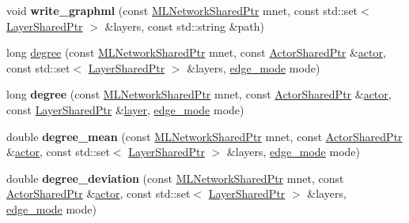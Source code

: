 \begin{DoxyCompactItemize}
\item 
\hypertarget{namespacemlnet_ad9d70122d3cdde2bbd59caa41d5c9e9d}{void {\bfseries write\+\_\+graphml} (const \hyperlink{namespacemlnet_aa6d3fa87865bcde4d1283abb1942cbbb}{M\+L\+Network\+Shared\+Ptr} mnet, const std\+::set$<$ \hyperlink{namespacemlnet_a10c007fb811c55339dd5b9d32bb0505d}{Layer\+Shared\+Ptr} $>$ \&layers, const std\+::string \&path)}\label{namespacemlnet_ad9d70122d3cdde2bbd59caa41d5c9e9d}

\item 
long \hyperlink{namespacemlnet_a50cfb15dd81a37b140f555047059915d}{degree} (const \hyperlink{namespacemlnet_aa6d3fa87865bcde4d1283abb1942cbbb}{M\+L\+Network\+Shared\+Ptr} mnet, const \hyperlink{namespacemlnet_a714fd98ffaeaadd5c38d61fa53dc4d24}{Actor\+Shared\+Ptr} \&\hyperlink{classmlnet_1_1actor}{actor}, const std\+::set$<$ \hyperlink{namespacemlnet_a10c007fb811c55339dd5b9d32bb0505d}{Layer\+Shared\+Ptr} $>$ \&layers, \hyperlink{namespacemlnet_aa4ac93b948a2c3582aeead3f1c4ff022}{edge\+\_\+mode} mode)
\item 
\hypertarget{namespacemlnet_ad21ac2760a442203e6bab2e5f84b244c}{long {\bfseries degree} (const \hyperlink{namespacemlnet_aa6d3fa87865bcde4d1283abb1942cbbb}{M\+L\+Network\+Shared\+Ptr} mnet, const \hyperlink{namespacemlnet_a714fd98ffaeaadd5c38d61fa53dc4d24}{Actor\+Shared\+Ptr} \&\hyperlink{classmlnet_1_1actor}{actor}, const \hyperlink{namespacemlnet_a10c007fb811c55339dd5b9d32bb0505d}{Layer\+Shared\+Ptr} \&\hyperlink{classmlnet_1_1layer}{layer}, \hyperlink{namespacemlnet_aa4ac93b948a2c3582aeead3f1c4ff022}{edge\+\_\+mode} mode)}\label{namespacemlnet_ad21ac2760a442203e6bab2e5f84b244c}

\item 
\hypertarget{namespacemlnet_ac40e8ba818168953d656475c9030f7a9}{double {\bfseries degree\+\_\+mean} (const \hyperlink{namespacemlnet_aa6d3fa87865bcde4d1283abb1942cbbb}{M\+L\+Network\+Shared\+Ptr} mnet, const \hyperlink{namespacemlnet_a714fd98ffaeaadd5c38d61fa53dc4d24}{Actor\+Shared\+Ptr} \&\hyperlink{classmlnet_1_1actor}{actor}, const std\+::set$<$ \hyperlink{namespacemlnet_a10c007fb811c55339dd5b9d32bb0505d}{Layer\+Shared\+Ptr} $>$ \&layers, \hyperlink{namespacemlnet_aa4ac93b948a2c3582aeead3f1c4ff022}{edge\+\_\+mode} mode)}\label{namespacemlnet_ac40e8ba818168953d656475c9030f7a9}

\item 
\hypertarget{namespacemlnet_a51b9a01991bc0bcef7c09f0c67e2de91}{double {\bfseries degree\+\_\+deviation} (const \hyperlink{namespacemlnet_aa6d3fa87865bcde4d1283abb1942cbbb}{M\+L\+Network\+Shared\+Ptr} mnet, const \hyperlink{namespacemlnet_a714fd98ffaeaadd5c38d61fa53dc4d24}{Actor\+Shared\+Ptr} \&\hyperlink{classmlnet_1_1actor}{actor}, const std\+::set$<$ \hyperlink{namespacemlnet_a10c007fb811c55339dd5b9d32bb0505d}{Layer\+Shared\+Ptr} $>$ \&layers, \hyperlink{namespacemlnet_aa4ac93b948a2c3582aeead3f1c4ff022}{edge\+\_\+mode} mode)}\label{namespacemlnet_a51b9a01991bc0bcef7c09f0c67e2de91}


\end{DoxyCompactItemize}
